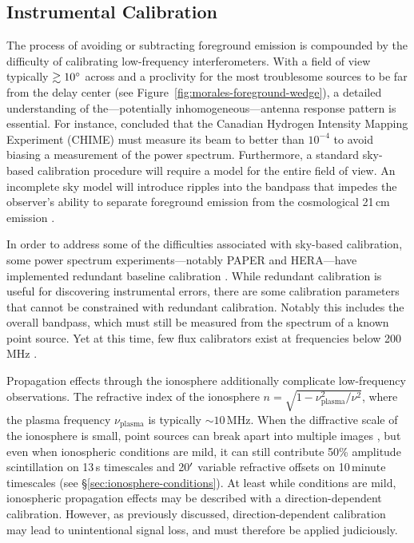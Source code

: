 \begin{bibunit}
\subsection{Instrumental Calibration}

The process of avoiding or subtracting foreground emission is compounded by the difficulty of
calibrating low-frequency interferometers.  With a field of view typically $\gtrsim10\mbox{$^\circ$}$ across
and a proclivity for the most troublesome sources to be far from the delay center (see
Figure~\ref{fig:morales-foreground-wedge}), a detailed understanding of the---potentially
inhomogeneous---antenna response pattern is essential.  For instance, \citet{2015PhRvD..91h3514S}
concluded that the Canadian Hydrogen Intensity Mapping Experiment (CHIME) must measure its beam to
better than $10^{-4}$ to avoid biasing a measurement of the power spectrum.  Furthermore, a standard
sky-based calibration procedure will require a model for the entire field of view. An incomplete sky
model will introduce ripples into the bandpass that impedes the observer's ability to separate
foreground emission from the cosmological 21\,cm emission \citep[e.g.,
Figure~\ref{fig:morales-foreground-wedge};][]{2016MNRAS.461.3135B, 2017MNRAS.470.1849E}.

In order to address some of the difficulties associated with sky-based calibration, some power
spectrum experiments---notably PAPER and HERA---have implemented redundant baseline calibration
\citep{2010MNRAS.408.1029L}. While redundant calibration is useful for discovering instrumental
errors, there are some calibration parameters that cannot be constrained with redundant calibration.
Notably this includes the overall bandpass, which must still be measured from the spectrum of a
known point source. Yet at this time, few flux calibrators exist at frequencies below 200\,MHz
\citep{2012MNRAS.423L..30S, 2017ApJS..230....7P}.

Propagation effects through the ionosphere additionally complicate low-frequency observations. The
refractive index of the ionosphere $n = \sqrt{1 - \nu_\text{plasma}^2/\nu^2}$, where the plasma
frequency $\nu_\text{plasma}$ is typically $\sim10\,\text{MHz}$. When the diffractive scale of the
ionosphere is small, point sources can break apart into multiple images \citep{2015MNRAS.453..925V},
but even when ionospheric conditions are mild, it can still contribute 50\% amplitude scintillation
on 13\,s timescales and 20$\mbox{$^\prime$}$ variable refractive offsets on 10\,minute timescales (see
\S\ref{sec:ionosphere-conditions}).  At least while conditions are mild, ionospheric propagation
effects may be described with a direction-dependent calibration. However, as previously discussed,
direction-dependent calibration may lead to unintentional signal loss, and must therefore be applied
judiciously.


\end{bibunit}
